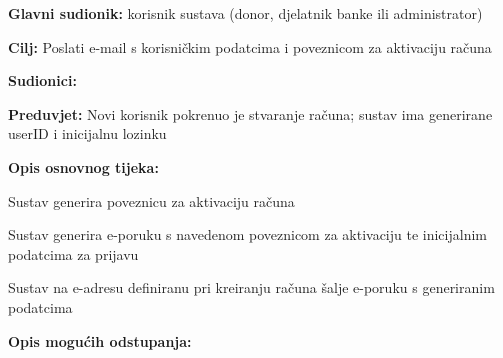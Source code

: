 						
	
							
						
					
					\noindent {}
					\begin{packed_item} \label{UC2}
	
						\item \textbf{Glavni sudionik: } korisnik sustava (donor, djelatnik banke ili administrator)
						\item  \textbf{Cilj:} Poslati e-mail s korisničkim podatcima i poveznicom za aktivaciju računa
						\item  \textbf{Sudionici:} 
						\item  \textbf{Preduvjet:} Novi korisnik pokrenuo je stvaranje računa; sustav ima generirane userID i inicijalnu lozinku
						\item  \textbf{Opis osnovnog tijeka:}
						
						\item[] \begin{packed_enum}
	                        \item Sustav generira poveznicu za aktivaciju računa
	                        \item Sustav generira e-poruku s navedenom poveznicom za aktivaciju te inicijalnim podatcima za prijavu
	                        \item Sustav na e-adresu definiranu pri kreiranju računa šalje e-poruku s generiranim podatcima
						\end{packed_enum}
						
						\item  \textbf{Opis mogućih odstupanja:}
						
					\end{packed_item}
					
